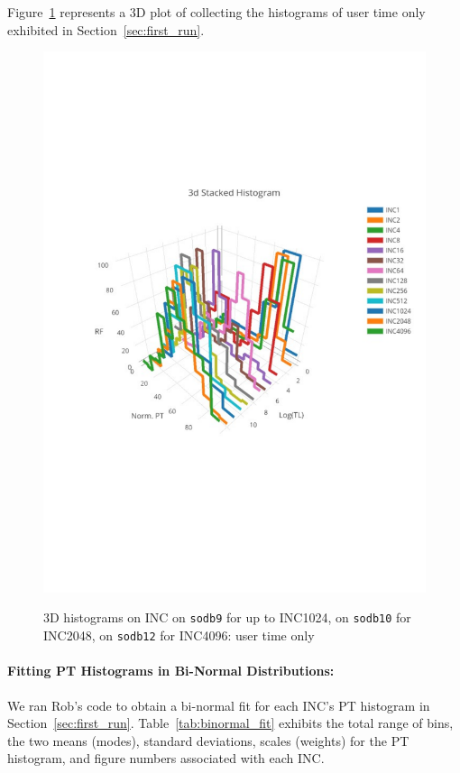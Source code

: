 \pagebreak
\clearpage
Figure~\ref{fig:hist3d_u} represents a 3D plot of collecting the histograms of user time only
exhibited in Section~\ref{sec:first_run}. 
\begin{figure}[htp!]
	\centering
	\includegraphics[scale=1]{u_s_time/3dplot_utime_only}\label{fig:3d_plot_u}
	\caption{3D histograms on INC on {\tt sodb9} for up to INC1024, on {\tt sodb10} for INC2048, on {\tt sodb12} for INC4096: user time only~\label{fig:hist3d_u}}
\end{figure}

\clearpage
\pagebreak

\paragraph{Fitting PT Histograms in Bi-Normal Distributions:}
We ran Rob's code to obtain a bi-normal fit for each INC's PT histogram 
in Section~\ref{sec:first_run}. 
Table~\ref{tab:binormal_fit} exhibits the total range of bins, the two means (modes), standard deviations, scales (weights) 
for the PT histogram, and figure numbers associated with each INC.

